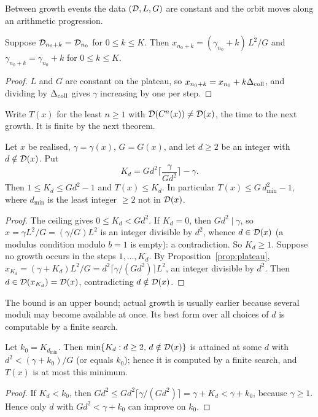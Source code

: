 Between growth events the data \((\mathcal{D},L,G)\) are constant and the orbit moves along an arithmetic progression.

\begin{proposition}\label{prop:plateau}
Suppose \(\mathcal{D}_{n_0+k}=\mathcal{D}_{n_0}\) for \(0\le k\le K\). Then \(x_{n_0+k}=(\gamma_{n_0}+k)\,L^2/G\) and \(\gamma_{n_0+k}=\gamma_{n_0}+k\) for \(0\le k\le K\).
\end{proposition}
\begin{proof}
\(L\) and \(G\) are constant on the plateau, so \(x_{n_0+k}=x_{n_0}+k\Delta_{\mathrm{coll}}\), and dividing by \(\Delta_{\mathrm{coll}}\) gives \(\gamma\) increasing by one per step.
\end{proof}

Write \(T(x)\) for the least \(n\ge1\) with \(\mathcal{D}(C^n(x))\ne\mathcal{D}(x)\), the time to the next growth. It is finite by the next theorem.

\begin{theorem}\label{thm:growth-time}
Let \(x\) be realised, \(\gamma=\gamma(x)\), \(G=G(x)\), and let \(d\ge2\) be an integer with \(d\notin\mathcal{D}(x)\). Put
\[
K_d=Gd^2\Big\lceil\frac{\gamma}{Gd^2}\Big\rceil-\gamma .
\]
Then \(1\le K_d\le Gd^2-1\) and \(T(x)\le K_d\). In particular \(T(x)\le G\,d_{\min}^2-1\), where \(d_{\min}\) is the least integer \(\ge2\) not in \(\mathcal{D}(x)\).
\end{theorem}
\begin{proof}
The ceiling gives \(0\le K_d<Gd^2\). If \(K_d=0\), then \(Gd^2\mid\gamma\), so \(x=\gamma L^2/G=(\gamma/G)L^2\) is an integer divisible by \(d^2\), whence \(d\in\mathcal{D}(x)\) (a modulus condition modulo \(b=1\) is empty): a contradiction. So \(K_d\ge1\). Suppose no growth occurs in the steps \(1,\dots,K_d\). By Proposition~\ref{prop:plateau}, \(x_{K_d}=(\gamma+K_d)L^2/G=d^2\lceil\gamma/(Gd^2)\rceil L^2\), an integer divisible by \(d^2\). Then \(d\in\mathcal{D}(x_{K_d})=\mathcal{D}(x)\), contradicting \(d\notin\mathcal{D}(x)\).
\end{proof}

The bound is an upper bound; actual growth is usually earlier because several moduli may become available at once. Its best form over all choices of \(d\) is computable by a finite search.

\begin{proposition}\label{prop:minK}
Let \(k_0=K_{d_{\min}}\). Then \(\min\{K_d:d\ge2,\,d\notin\mathcal{D}(x)\}\) is attained at some \(d\) with \(d^2<(\gamma+k_0)/G\) (or equals \(k_0\)); hence it is computed by a finite search, and \(T(x)\) is at most this minimum.
\end{proposition}
\begin{proof}
If \(K_d<k_0\), then \(Gd^2\le Gd^2\lceil\gamma/(Gd^2)\rceil=\gamma+K_d<\gamma+k_0\), because \(\gamma\ge1\). Hence only \(d\) with \(Gd^2<\gamma+k_0\) can improve on \(k_0\).
\end{proof}


